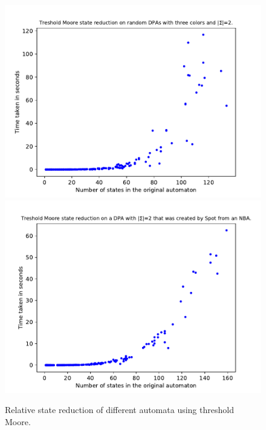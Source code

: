 \begin{figure}
\begin{minipage}{0.49\textwidth}
		\caption{Relative state reduction of different automata using threshold Moore.}
		\label{exp:fig:threshold_moore_reduct_sccs}
	\end{minipage}
	\hfill
	\begin{minipage}{0.49\textwidth}
		\includegraphics[page=5,height=.3\textheight]{../data/analysis/threshold_moore/gendet_ap1.pdf} 
		\includegraphics[page=5,height=.3\textheight]{../data/analysis/threshold_moore/detspot_ap1.pdf} 

\end{minipage}
\end{figure}
